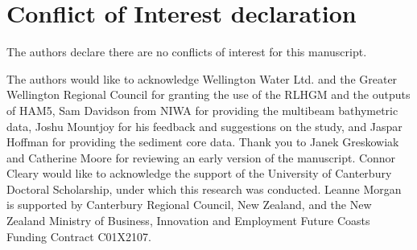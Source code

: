 \documentclass[draft, 10pt]{agujournal2019}
\begin{document}
\section*{Conflict of Interest declaration}
The authors declare there are no conflicts of interest for this manuscript.

\acknowledgments
The authors would like to acknowledge Wellington Water Ltd. and the Greater Wellington Regional Council for granting the use of the RLHGM and the outputs of HAM5, Sam Davidson from NIWA for providing the multibeam bathymetric data, Joshu Mountjoy for his feedback and suggestions on the study, and Jaspar Hoffman for providing the sediment core data. Thank you to Janek Greskowiak and Catherine Moore for reviewing an early version of the manuscript. Connor Cleary would like to acknowledge the support of the University of Canterbury Doctoral Scholarship, under which this research was conducted. Leanne Morgan is supported by Canterbury Regional Council, New Zealand, and the New Zealand Ministry of Business, Innovation and Employment Future Coasts Funding Contract C01X2107. %


\end{document}

